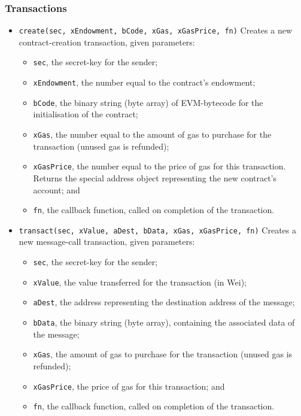 \documentclass[9pt,oneside]{amsart}
\begin{document}
\subsubsection{Transactions}

\begin{itemize}
\item \texttt{create(sec, xEndowment, bCode, xGas, xGasPrice, fn)} Creates a new contract-creation transaction, given parameters:
\begin{itemize}
\item \texttt{sec}, the secret-key for the sender;
\item \texttt{xEndowment}, the number equal to the contract's endowment;
\item \texttt{bCode}, the binary string (byte array) of EVM-bytecode for the initialisation of the contract;
\item \texttt{xGas}, the number equal to the amount of gas to purchase for the transaction (unused gas is refunded);
\item \texttt{xGasPrice}, the number equal to the price of gas for this transaction. Returns the special address object representing the new contract's account; and
\item \texttt{fn}, the callback function, called on completion of the transaction.
\end{itemize}
\item \texttt{transact(sec, xValue, aDest, bData, xGas, xGasPrice, fn)} Creates a new message-call transaction, given parameters:
\begin{itemize}
\item \texttt{sec}, the secret-key for the sender;
\item \texttt{xValue}, the value transferred for the transaction (in Wei);
\item \texttt{aDest}, the address representing the destination address of the message;
\item \texttt{bData}, the binary string (byte array), containing the associated data of the message;
\item \texttt{xGas}, the amount of gas to purchase for the transaction (unused gas is refunded);
\item \texttt{xGasPrice}, the price of gas for this transaction; and
\item \texttt{fn}, the callback function, called on completion of the transaction.
\end{itemize}
\end{itemize}
\end{document}
